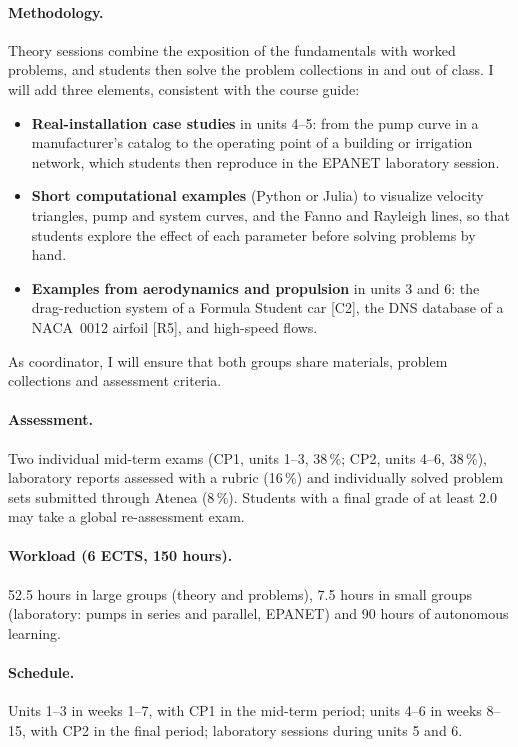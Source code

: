 \documentclass[11pt]{article}
\begin{document}
\paragraph{Methodology.} Theory sessions combine the exposition of the fundamentals with
worked problems, and students then solve the problem collections in and out of class. I
will add three elements, consistent with the course guide:
\begin{itemize}
  \item \textbf{Real-installation case studies} in units 4--5: from the pump curve in a
  manufacturer's catalog to the operating point of a building or irrigation network, which
  students then reproduce in the EPANET laboratory session.
  \item \textbf{Short computational examples} (Python or Julia) to visualize velocity
  triangles, pump and system curves, and the Fanno and Rayleigh lines, so that students
  explore the effect of each parameter before solving problems by hand.
  \item \textbf{Examples from aerodynamics and propulsion} in units 3 and 6: the
  drag-reduction system of a Formula Student car [C2], the DNS database of a NACA~0012
  airfoil [R5], and high-speed flows.
\end{itemize}
As coordinator, I will ensure that both groups share materials, problem collections and
assessment criteria.

\paragraph{Assessment.} Two individual mid-term exams (CP1, units 1--3, 38\,\%; CP2, units
4--6, 38\,\%), laboratory reports assessed with a rubric (16\,\%) and individually solved
problem sets submitted through Atenea (8\,\%). Students with a final grade of at least 2.0
may take a global re-assessment exam.

\paragraph{Workload (6 ECTS, 150 hours).} 52.5 hours in large groups (theory and
problems), 7.5 hours in small groups (laboratory: pumps in series and parallel, EPANET) and
90 hours of autonomous learning.

\paragraph{Schedule.} Units 1--3 in weeks 1--7, with CP1 in the mid-term period; units
4--6 in weeks 8--15, with CP2 in the final period; laboratory sessions during units 5 and
6.
\end{document}

